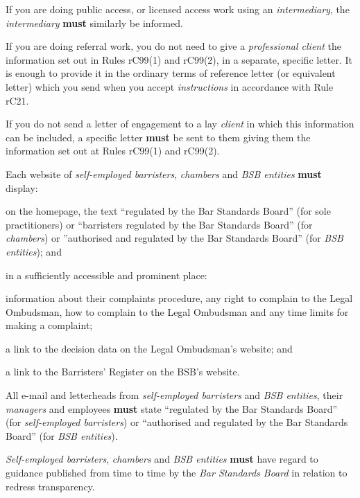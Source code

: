 If you are doing public access, or licensed access work using an
\emph{intermediary}, the \emph{intermediary} \textcolor{myred}{\textbf{must}} similarly be informed.


If you are doing referral work, you do not need to give a
\emph{professional client} the information set out in Rules rC99(1) and
rC99(2), in a separate, specific letter. It is enough to provide it in
the ordinary terms of reference letter (or equivalent letter) which you
send when you accept \emph{instructions} in accordance with Rule rC21.


If you do not send a letter of engagement to a lay \emph{client} in
which this information can be included, a specific letter \textcolor{myred}{\textbf{must}} be sent
to them giving them the information set out at Rules rC99(1) and rC99(2).


Each website of \emph{self-employed barristers}, \emph{chambers} and
\emph{BSB entities} \textcolor{myred}{\textbf{must}} display:
\begin{numlist}\item on the homepage, the text ``regulated by the Bar Standards Board''
(for sole practitioners) or ``barristers regulated by the Bar Standards
Board'' (for \emph{chambers}) or ''authorised and regulated by the Bar
Standards Board'' (for \emph{BSB entities}); and
\item in a sufficiently accessible and prominent place:
\begin{alphlist}\item information about their complaints procedure, any right to complain
to the Legal Ombudsman, how to complain to the Legal Ombudsman and any
time limits for making a complaint;
\item a link to the decision data on the Legal Ombudsman's website; and
\item a link to the Barristers' Register on the BSB's website.\end{alphlist}
\item All e-mail and letterheads from \emph{self-employed barristers} and
\emph{BSB entities}, their \emph{managers} and employees \textcolor{myred}{\textbf{must}} state
``regulated by the Bar Standards Board'' (for \emph{self-employed
barristers}) or ``authorised and regulated by the Bar Standards Board''
(for \emph{BSB entities}).
\item \emph{Self-employed barristers}, \emph{chambers} and \emph{BSB
entities} \textcolor{myred}{\textbf{must}} have regard to guidance published from time to time by
the \emph{Bar Standards Board} in relation to redress transparency.
\end{numlist}
